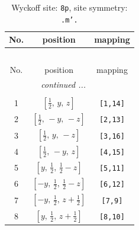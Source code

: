 \documentclass[fleqn,8pt]{jsarticle}
\begin{document}
\begin{longtable}{ccc}
\caption{Wyckoff site: {\tt 8p}, site symmetry: {\tt .m'.}}
 \\
 \hline \hline
No. & position & mapping \\ \hline \endfirsthead

\multicolumn{2}{l}{\tablename\ \thetable{}} \\
 \hline \hline
No. & position & mapping \\ \hline \endhead

 \hline \hline
\multicolumn{2}{r}{\footnotesize\it continued ...} \\ \endfoot

 \hline \hline
\multicolumn{2}{r}{} \\ \endlastfoot

1 & $\left[ \frac{1}{2},\, y,\, z \right]$ & {\tt [1,14]} \\ \hline
2 & $\left[ \frac{1}{2},\, - y,\, - z \right]$ & {\tt [2,13]} \\ \hline
3 & $\left[ \frac{1}{2},\, y,\, - z \right]$ & {\tt [3,16]} \\ \hline
4 & $\left[ \frac{1}{2},\, - y,\, z \right]$ & {\tt [4,15]} \\ \hline
5 & $\left[ y,\, \frac{1}{2},\, \frac{1}{2} - z \right]$ & {\tt [5,11]} \\ \hline
6 & $\left[ - y,\, \frac{1}{2},\, \frac{1}{2} - z \right]$ & {\tt [6,12]} \\ \hline
7 & $\left[ - y,\, \frac{1}{2},\, z + \frac{1}{2} \right]$ & {\tt [7,9]} \\ \hline
8 & $\left[ y,\, \frac{1}{2},\, z + \frac{1}{2} \right]$ & {\tt [8,10]} \\
\end{longtable}
\renewcommand{\arraystretch}{1.2}
\end{document}
